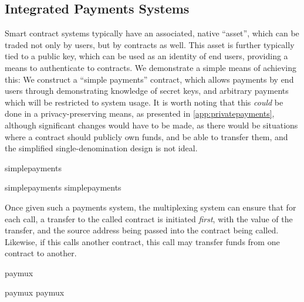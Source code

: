 \subsection{Integrated Payments Systems}
\label{sec:payments}

Smart contract systems typically have an associated, native ``asset'', which can
be traded not only by users, but by contracts as well. This asset is further
typically tied to a public key, which can be used as an identity of end users,
providing a means to authenticate to contracts. We demonstrate a simple means of
achieving this: We construct a ``simple payments'' contract, which allows
payments by end users through demonstrating knowledge of secret keys, and
arbitrary payments which will be restricted to system usage. It is worth noting
that this \emph{could} be done in a privacy-preserving means, as presented in
\autoref{app:privatepayments}, although significant changes would have to be
made, as there would be situations where a contract should publicly own funds,
and be able to transfer them, and the simplified single-denomination design is
not ideal.

{simplepayments}

{simplepayments}
{simplepayments}

Once given such a payments system, the multiplexing system can ensure that for
each call, a transfer to the called contract is initiated \emph{first}, with the
value of the transfer, and the source address being passed into the contract
being called. Likewise, if this calls another contract, this call may transfer
funds from one contract to another.

{paymux}

{paymux}
{paymux}

